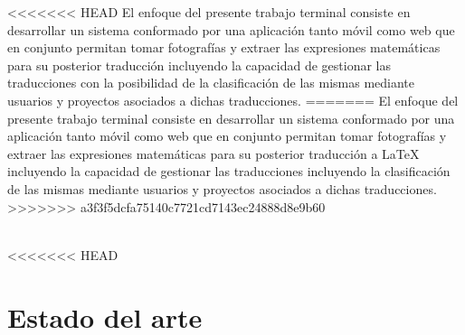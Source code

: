 <<<<<<< HEAD
El enfoque del presente trabajo terminal consiste en desarrollar un sistema conformado por una aplicación tanto móvil como web que en conjunto permitan tomar fotografías y extraer las expresiones matemáticas para su posterior traducción incluyendo la capacidad de gestionar las traducciones con la posibilidad de la clasificación de las mismas mediante usuarios y proyectos asociados a dichas traducciones.
=======
El enfoque del presente trabajo terminal consiste en desarrollar un sistema conformado por una aplicación tanto móvil como web que en conjunto permitan tomar fotografías y extraer las expresiones matemáticas para su posterior traducción a \LaTeX{} incluyendo la capacidad de gestionar las traducciones incluyendo la clasificación de las mismas mediante usuarios y proyectos asociados a dichas traducciones.
>>>>>>> a3f3f5dcfa75140c7721cd7143ec24888d8e9b60
\\\\%



\newpage

<<<<<<< HEAD
\section{Estado del arte}

